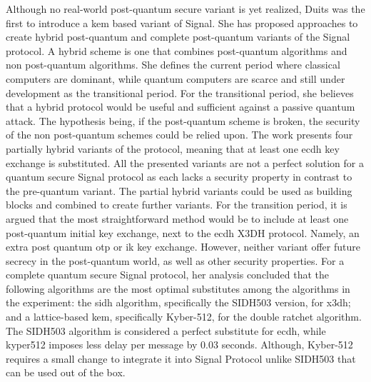 \par
Although no real-world post-quantum secure variant is yet realized, Duits \cite{duits2019post} was the first to introduce a \gls{kem} based variant of Signal. She has proposed approaches to create hybrid post-quantum and complete post-quantum variants of the Signal protocol. A hybrid scheme is one that combines post-quantum algorithms and non post-quantum algorithms. She defines the current period where classical computers are dominant, while quantum computers are scarce and still under development as the transitional period. For the transitional period, she believes that a hybrid protocol would be useful and sufficient against a passive quantum attack. The hypothesis being, if the post-quantum scheme is broken, the security of the non post-quantum schemes could be relied upon. The work presents four partially hybrid variants of the protocol, meaning that at least one \gls{ecdh} key exchange is substituted. All the presented variants are not a perfect solution for a quantum secure Signal protocol as each lacks a security property in contrast to the pre-quantum variant.
The partial hybrid variants could be used as building blocks and combined to create further variants. For the transition period, it is argued that the most straightforward method would be to include at least one post-quantum initial key exchange, next to the \gls{ecdh} X3DH protocol. Namely, an extra post quantum \gls{otp} or \gls{ik} key exchange. However, neither variant offer future secrecy in the post-quantum world, as well as other security properties. For a complete quantum secure Signal protocol, her analysis concluded that the following algorithms are the most optimal substitutes among the algorithms in the experiment: the \gls{sidh} algorithm, specifically the SIDH503 version, for \gls{x3dh}; and a lattice-based \gls{kem}, specifically Kyber-512, for the double ratchet algorithm. The SIDH503 algorithm is considered a perfect substitute for \gls{ecdh}, while kyper512 imposes less delay per message by $ 0.03 $ seconds. Although, Kyber-512 requires a small change to integrate it into Signal Protocol unlike SIDH503 that can be used out of the box.
\par
